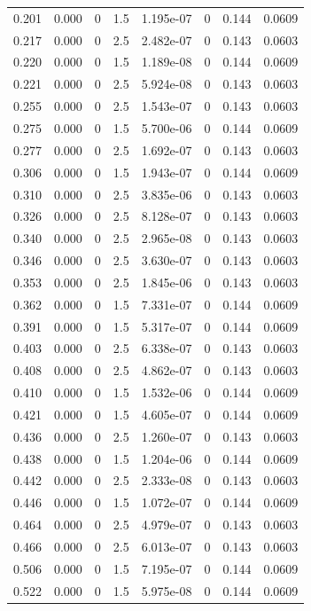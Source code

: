\documentclass[preview]{standalone}
\begin{document}
{{\begin{tabular}{L{1.2cm}C{1.2cm} C{0.3cm}C{0.5cm} C{1.4cm}C{1.4cm} C{1.4cm}C{1.4cm}}
  0.201  &  0.000  & 0     & 1.5 &  1.195e-07  & 0  & 0.144 &  0.0609   \\ 
  0.217  &  0.000  & 0     & 2.5 &  2.482e-07  & 0  & 0.143 &  0.0603   \\ 
  0.220  &  0.000  & 0     & 1.5 &  1.189e-08  & 0  & 0.144 &  0.0609   \\ 
  0.221  &  0.000  & 0     & 2.5 &  5.924e-08  & 0  & 0.143 &  0.0603   \\ 
  0.255  &  0.000  & 0     & 2.5 &  1.543e-07  & 0  & 0.143 &  0.0603   \\ 
  0.275  &  0.000  & 0     & 1.5 &  5.700e-06  & 0  & 0.144 &  0.0609   \\ 
  0.277  &  0.000  & 0     & 2.5 &  1.692e-07  & 0  & 0.143 &  0.0603   \\ 
  0.306  &  0.000  & 0     & 1.5 &  1.943e-07  & 0  & 0.144 &  0.0609   \\ 
  0.310  &  0.000  & 0     & 2.5 &  3.835e-06  & 0  & 0.143 &  0.0603   \\ 
  0.326  &  0.000  & 0     & 2.5 &  8.128e-07  & 0  & 0.143 &  0.0603   \\ 
  0.340  &  0.000  & 0     & 2.5 &  2.965e-08  & 0  & 0.143 &  0.0603   \\ 
  0.346  &  0.000  & 0     & 2.5 &  3.630e-07  & 0  & 0.143 &  0.0603   \\ 
  0.353  &  0.000  & 0     & 2.5 &  1.845e-06  & 0  & 0.143 &  0.0603   \\ 
  0.362  &  0.000  & 0     & 1.5 &  7.331e-07  & 0  & 0.144 &  0.0609   \\ 
  0.391  &  0.000  & 0     & 1.5 &  5.317e-07  & 0  & 0.144 &  0.0609   \\ 
  0.403  &  0.000  & 0     & 2.5 &  6.338e-07  & 0  & 0.143 &  0.0603   \\ 
  0.408  &  0.000  & 0     & 2.5 &  4.862e-07  & 0  & 0.143 &  0.0603   \\ 
  0.410  &  0.000  & 0     & 1.5 &  1.532e-06  & 0  & 0.144 &  0.0609   \\ 
  0.421  &  0.000  & 0     & 1.5 &  4.605e-07  & 0  & 0.144 &  0.0609   \\ 
  0.436  &  0.000  & 0     & 2.5 &  1.260e-07  & 0  & 0.143 &  0.0603   \\ 
  0.438  &  0.000  & 0     & 1.5 &  1.204e-06  & 0  & 0.144 &  0.0609   \\ 
  0.442  &  0.000  & 0     & 2.5 &  2.333e-08  & 0  & 0.143 &  0.0603   \\ 
  0.446  &  0.000  & 0     & 1.5 &  1.072e-07  & 0  & 0.144 &  0.0609   \\ 
  0.464  &  0.000  & 0     & 2.5 &  4.979e-07  & 0  & 0.143 &  0.0603   \\ 
  0.466  &  0.000  & 0     & 2.5 &  6.013e-07  & 0  & 0.143 &  0.0603   \\ 
  0.506  &  0.000  & 0     & 1.5 &  7.195e-07  & 0  & 0.144 &  0.0609   \\ 
  0.522  &  0.000  & 0     & 1.5 &  5.975e-08  & 0  & 0.144 &  0.0609   \\ 
\hline 
\end{tabular} 

}}
\end{document}
